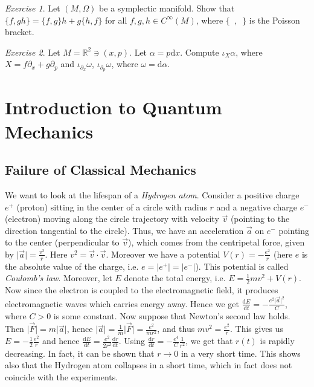 \documentclass[12pt]{amsart}
\numberwithin{equation}{section}
\theoremstyle{plain}
\theoremstyle{definition}
\theoremstyle{remark}
\newtheorem{exe}{Exercise}[subsection]
\newcommand{\R}{\mathbb{R}}
\newcommand{\dd}{{\mathrm{d}}}
\begin{document}
\begin{exe}
Let $(M,\Omega)$ be a symplectic manifold. Show that $\{f,gh\}=\{f,g\}h+g\{h,f\}$ for all $f,g,h\in C^\infty(M)$, where $\{\enspace,\enspace\}$ is the Poisson bracket.
\end{exe}

\begin{exe}
Let $M=\R^2\ni (x,p)$. Let $\alpha=p\dd x$. Compute $\iota_X\alpha$, where $X=f\partial_x+g\partial_p$ and $\iota_{\partial_x}\omega$, $\iota_{\partial_p}\omega$, where $\omega=\dd\alpha$.
\end{exe}

\section{Introduction to Quantum Mechanics}

\subsection{Failure of Classical Mechanics}
We want to look at the lifespan of a \emph{Hydrogen atom}. Consider a positive charge $e^+$ (proton) sitting in the center of a circle with radius $r$ and a negative charge $e^-$ (electron) moving along the circle trajectory with velocity $\vec{v}$ (pointing to the direction tangential to the circle). Thus, we have an acceleration $\vec{a}$ on $e^-$ pointing to the center (perpendicular to $\vec{v}$), which comes from the centripetal force, given by $\vert\vec{a}\vert=\frac{v^2}{r}$. Here $v^2=\vec{v}\cdot\vec{v}$. Moreover we have a potential $V(r)=-\frac{e^2}{r}$ (here $e$ is the absolute value of the charge, i.e. $e=\vert e^+\vert=\vert e^-\vert$). This potential is called \emph{Coulomb's law}. Moreover, let $E$ denote the total energy, i.e. $E=\frac{1}{2}mv^2+V(r)$. Now since the electron is coupled to the electromagnetic field, it produces electromagnetic waves which carries energy away. Hence we get
$\frac{\dd E}{\dd t}=-\frac{e^2\vert \vec{a}\vert^2}{C}$, where $C>0$ is some constant. Now suppose that Newton's second law holds. Then $\vert \vec{F}\vert=m\vert \vec{a}\vert$, hence $\vert \vec{a}\vert=\frac{1}{m}\vert\vec{F}\vert=\frac{e^2}{mr^2}$, and thus $mv^2=\frac{e^2}{r}$. This gives us $E=-\frac{1}{2}\frac{e^2}{r}$ and hence $\frac{\dd E}{\dd t}=\frac{e^2}{2r^2}\frac{\dd r}{\dd t}$. Using $\frac{\dd r}{\dd t}=-\frac{e^4}{C}\frac{1}{r^2}$, we get that $r(t)$ is rapidly decreasing. In fact, it can be shown that $r\to 0$ in a very short time. This shows also that the Hydrogen atom collapses in a short time, which in fact does not coincide with the experiments. 
\end{document}
